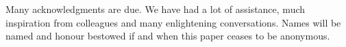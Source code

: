\documentclass{sigplanconf}
\begin{document}
%

\acks

Many acknowledgments are due. We have had a lot of assistance, much
inspiration from colleagues and many enlightening conversations. Names
will be named and honour bestowed if and when this paper ceases to be
anonymous.







%
%
\end{document}
